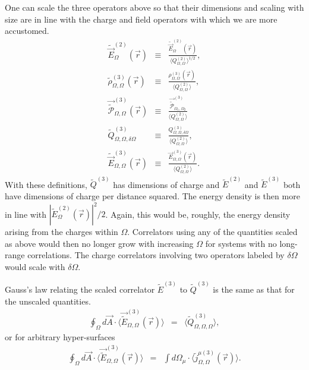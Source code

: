 \documentclass[aps, prc, 12pt, nofootinbib, showpacs, superscriptaddress, tightenlines, groupedaddress]{revtex4-2}
\begin{document}
One can scale the three operators above so that their dimensions and scaling with size are in line with the charge and field operators with which we are more accustomed.
\begin{eqnarray}
\tilde{\vec{E}}^{(2)}_{\Omega}(\vec{r})&\equiv&\frac{\tilde{\vec{E}}^{(2)}_{\Omega}(\vec{r})}{\langle Q^{(2)}_{\Omega,\Omega}\rangle^{1/2}},\\
\nonumber
\tilde{\rho}^{(3)}_{\Omega,\Omega}(\vec{r})&\equiv&\frac{\rho^{(3)}_{\Omega,\Omega}(\vec{r})}{\langle Q^{(2)}_{\Omega,\Omega}\rangle},\\
\nonumber
\vec{\tilde{\mathcal{P}}}_{\Omega,\Omega}^{(3)}(\vec{r})&\equiv&\frac{\vec{\tilde{\mathcal{P}}}_{\Omega_1,\Omega_2}^{(3)}}{\langle Q^{(2)}_{\Omega,\Omega}\rangle}\\
\nonumber
\tilde{Q}^{(3)}_{\Omega,\Omega,\delta\Omega}&\equiv&\frac{Q^{(3)}_{\Omega,\Omega,\delta\Omega}}{\langle Q^{(2)}_{\Omega,\Omega}\rangle},\\
\nonumber
\tilde{\vec{E}}^{(3)}_{\Omega,\Omega}(\vec{r})&\equiv&\frac{\vec{E}^{(3)}_{\Omega,\Omega}(\vec{r})}{\langle Q^{(2)}_{\Omega,\Omega}\rangle}.
\end{eqnarray}
With these definitions, $\tilde{Q}^{(3)}$ has dimensions of charge and $\tilde{E}^{(2)}$ and $\tilde{E}^{(3)}$ both have dimensions of charge per distance squared. The energy density is then more in line with $|\tilde{E}_{\Omega}^{(2)}(\vec{r})|^2/2$. Again, this would be, roughly, the energy density arising from the charges within $\Omega$. Correlators using any of the quantities scaled as above would then no longer grow with increasing $\Omega$ for systems with no long-range correlations. The charge correlators involving two operators labeled by $\delta\Omega$ would scale with $\delta\Omega$. 

Gauss's law relating  the scaled correlator $\tilde{E}^{(3)}$ to $\tilde{Q}^{(3)}$ is the same as that for the unscaled quantities.
\begin{eqnarray}
\oint_{\Omega} d\vec{A}\cdot\langle\vec{\tilde{E}}^{(3)}_{\Omega,\Omega}(\vec{r})\rangle&=&
\langle \tilde{Q}^{(3)}_{\Omega,\Omega,\Omega}\rangle,
\end{eqnarray}
or for arbitrary hyper-surfaces
\begin{eqnarray}\label{eq:gauss_scaled}
\oint_{\Omega} d\vec{A}\cdot\langle\vec{\tilde{E}}^{(3)}_{\Omega,\Omega}(\vec{r})\rangle&=&
\int d\Omega_{\mu}\cdot\langle \tilde{j}^{\mu(3)}_{\Omega,\Omega}(\vec{r})\rangle.
\end{eqnarray}
\end{document}
